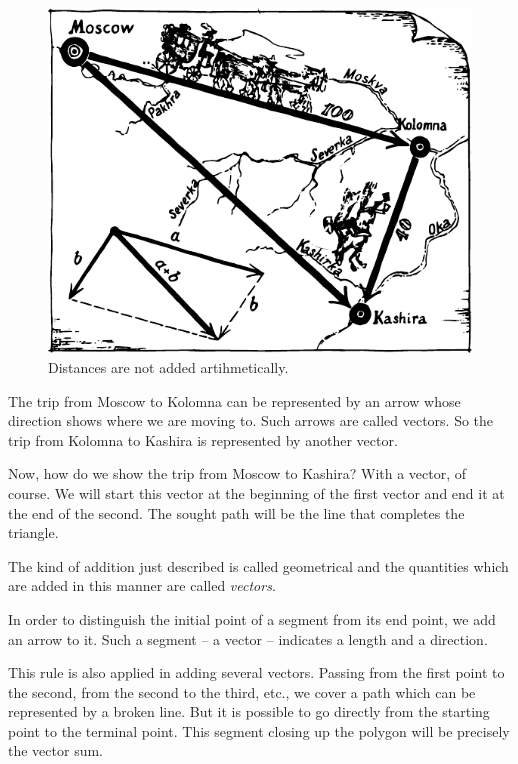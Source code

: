\begin{figure}[!ht]
\centering
\includegraphics[width=\textwidth]{figures/fig-01-04.pdf}
\caption{Distances are not added artihmetically.}
\label{fig-1.4}
\end{figure}

The trip from Moscow to Kolomna can be represented by an arrow whose
direction shows where we are moving to. Such arrows are called
vectors. So the trip from Kolomna to Kashira is represented by
another vector.  

Now, how do we show the trip from Moscow to Kashira? With a vector, of
course. We will start this vector at the beginning of the first vector
and end it at the end of the second. The sought path will be the line
that completes the triangle.

The kind of addition just described is called geometrical and the
quantities which are added in this manner are called \emph{vectors}.

In order to distinguish the initial point of a segment from its end
point, we add an arrow to it. Such a segment -- a vector -- indicates a
length and a direction.  

This rule is also applied in adding several vectors.  Passing from the
first point to the second, from the second to the third, etc., we
cover a path which can be represented by a broken line. But it is
possible to go directly from the starting point to the terminal
point. This segment closing up the polygon will be precisely the
vector sum.  

